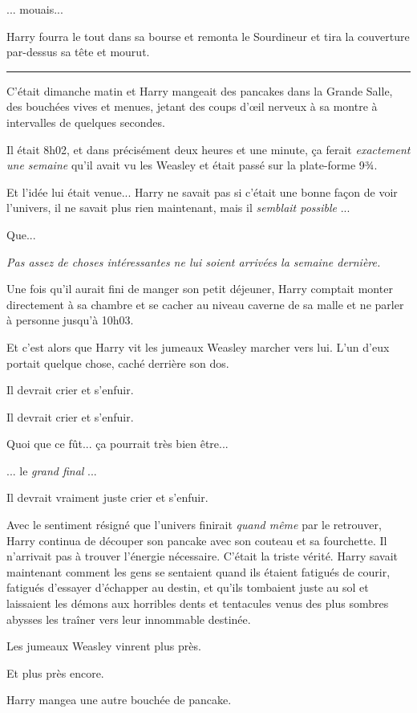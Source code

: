 ... mouais...

Harry fourra le tout dans sa bourse et remonta le Sourdineur et tira la couverture par-dessus sa tête et mourut.
\par\noindent\rule{\textwidth}{0.4pt}
C'était dimanche matin et Harry mangeait des pancakes dans la Grande Salle, des bouchées vives et menues, jetant des coups d'œil nerveux à sa montre à intervalles de quelques secondes.

Il était 8h02, et dans précisément deux heures et une minute, ça ferait \emph{exactement une semaine}  qu'il avait vu les Weasley et était passé sur la plate-forme 9¾.

Et l'idée lui était venue... Harry ne savait pas si c'était une bonne façon de voir l'univers, il ne savait plus rien maintenant, mais il \emph{semblait possible} ...

Que...

\emph{Pas assez de choses intéressantes ne lui soient arrivées la semaine dernière.} 

Une fois qu'il aurait fini de manger son petit déjeuner, Harry comptait monter directement à sa chambre et se cacher au niveau caverne de sa malle et ne parler à personne jusqu'à 10h03.

Et c'est alors que Harry vit les jumeaux Weasley marcher vers lui. L'un d'eux portait quelque chose, caché derrière son dos.

Il devrait crier et s'enfuir.

Il devrait crier et s'enfuir.

Quoi que ce fût... ça pourrait très bien être...

... le \emph{grand final} ...

Il devrait vraiment juste crier et s'enfuir.

Avec le sentiment résigné que l'univers finirait \emph{quand même}  par le retrouver, Harry continua de découper son pancake avec son couteau et sa fourchette. Il n'arrivait pas à trouver l'énergie nécessaire. C'était la triste vérité. Harry savait maintenant comment les gens se sentaient quand ils étaient fatigués de courir, fatigués d'essayer d'échapper au destin, et qu'ils tombaient juste au sol et laissaient les démons aux horribles dents et tentacules venus des plus sombres abysses les traîner vers leur innommable destinée.

Les jumeaux Weasley vinrent plus près.

Et plus près encore.

Harry mangea une autre bouchée de pancake.

